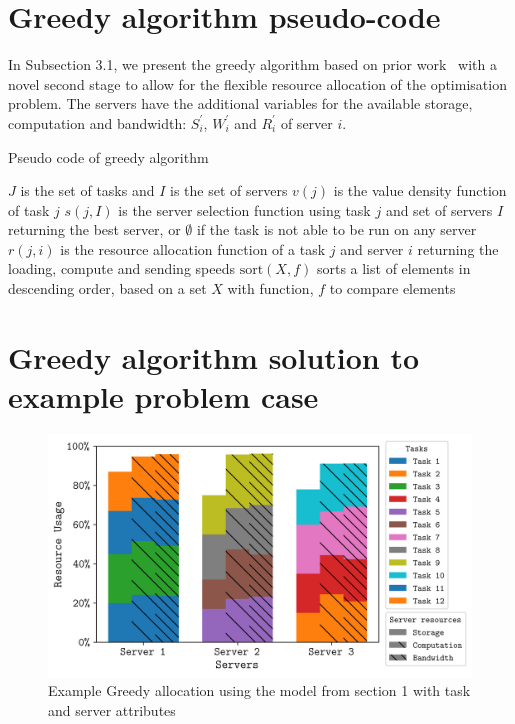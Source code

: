 \documentclass[sigconf]{aamas}
\begin{document}
\section{Greedy algorithm pseudo-code}
In Subsection 3.1, we present the greedy algorithm based on prior work~\cite{sahni1975approximate} with a novel second stage to allow for the flexible resource allocation of the optimisation problem. The servers have the additional variables for the available storage, computation and bandwidth: $S^{'}_i$, $W^{'}_i$ and $R^{'}_i$ of server $i$.

\begin{algorithm}[h]
    \caption{Pseudo code of greedy algorithm}
    \label{alg:greedy-algorithm}
    \begin{algorithmic}
        \REQUIRE $J$ is the set of tasks and $I$ is the set of servers
        \REQUIRE $v(j)$ is the value density function of task $j$
        \REQUIRE $s(j, I)$ is the server selection function using task $j$ and set of servers $I$ returning the best server, or $\emptyset$ if the task is not able to be run on any server
        \REQUIRE $r(j, i)$ is the resource allocation function of a task $j$ and server $i$ returning the
            loading, compute and sending speeds
        \REQUIRE $\text{sort}(X, f)$ sorts a list of elements in descending order, based on a set $X$ with function, $f$ to compare elements

            \ENDIF
        \ENDFOR
    \end{algorithmic}
\end{algorithm}

\section{Greedy algorithm solution to example problem case}
\begin{figure}[h]
    \centering
    \includegraphics[width=\linewidth]{figs/allocation/greedy_flexible_resource_allocation.png}
    \caption{Example Greedy allocation using the model from section 1 with task and server attributes}
    \label{fig:example-greedy-allocation}
\end{figure}
\end{document}
